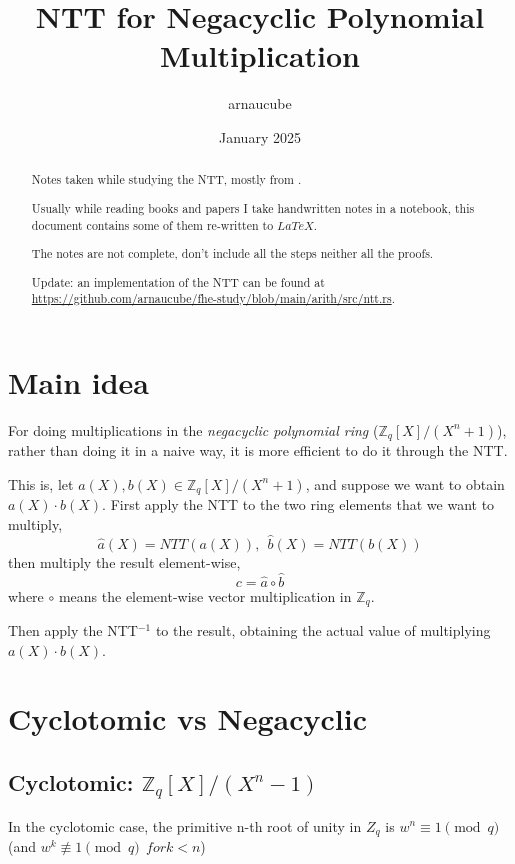 \documentclass{article}
\title{NTT for Negacyclic Polynomial Multiplication}
\author{arnaucube}
\date{January 2025}
\newcommand{\Zq}{\mathbb{Z}_q}
\newcommand{\Rq}{\mathbb{Z}_q[X]/(X^n+1)}
\begin{document}
\maketitle

\begin{abstract}
    Notes taken while studying the NTT, mostly from \cite{10177902}.

	Usually while reading books and papers I take handwritten notes in a notebook, this document contains some of them re-written to $LaTeX$.

	The notes are not complete, don't include all the steps neither all the proofs.

	Update: an implementation of the NTT can be found at\\
	\href{https://github.com/arnaucube/fhe-study/blob/main/arith/src/ntt.rs}{https://github.com/arnaucube/fhe-study/blob/main/arith/src/ntt.rs}.
\end{abstract}

\tableofcontents

\section{Main idea}
For doing multiplications in the \emph{negacyclic polynomial ring} ($\Rq$), rather than doing it in a naive way, it is more
efficient to do it through the NTT.

This is, let $a(X), b(X) \in \Rq$, and suppose we want to
obtain $a(X) \cdot b(X)$. First apply the NTT to the two ring
elements that we want to multiply,
$$\hat{a}(X) = NTT(a(X)),~~ \hat{b}(X)=NTT(b(X))$$
then multiply the result element-wise,
$$c= \hat{a} \circ \hat{b}$$
where $\circ$ means the element-wise vector multiplication in $\Zq$.

Then apply the NTT$^{-1}$ to the result, obtaining the actual value of
multiplying $a(X) \cdot b(X)$.

\section{Cyclotomic vs Negacyclic}

\subsection{Cyclotomic: \texorpdfstring{$\mathbb{Z}_q[X]/(X^n-1)$}{Zq[X]/(X**n-1)}}
In the cyclotomic case, the primitive n-th root of unity in $Z_q$ is $w^n \equiv 1 \pmod q$ (and
$w^k \not\equiv 1 \pmod q ~~ for k<n$)
\end{document}
